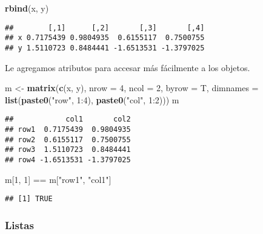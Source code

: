 \documentclass[]{article}
\newenvironment{Shaded}{\begin{snugshade}}{\end{snugshade}}
\newcommand{\KeywordTok}[1]{\textcolor[rgb]{0.13,0.29,0.53}{\textbf{{#1}}}}
\newcommand{\DataTypeTok}[1]{\textcolor[rgb]{0.13,0.29,0.53}{{#1}}}
\newcommand{\DecValTok}[1]{\textcolor[rgb]{0.00,0.00,0.81}{{#1}}}
\newcommand{\StringTok}[1]{\textcolor[rgb]{0.31,0.60,0.02}{{#1}}}
\newcommand{\NormalTok}[1]{{#1}}
\begin{document}
\begin{Shaded}
\begin{Highlighting}[]
\KeywordTok{rbind}\NormalTok{(x, y)}
\end{Highlighting}
\end{Shaded}

\begin{verbatim}
##        [,1]      [,2]       [,3]       [,4]
## x 0.7175439 0.9804935  0.6155117  0.7500755
## y 1.5110723 0.8484441 -1.6513531 -1.3797025
\end{verbatim}

Le agregamos atributos para accesar más fácilmente a los objetos.

\begin{Shaded}
\begin{Highlighting}[]
\NormalTok{m <-}\StringTok{ }\KeywordTok{matrix}\NormalTok{(}\KeywordTok{c}\NormalTok{(x, y), }\DataTypeTok{nrow =} \DecValTok{4}\NormalTok{, }\DataTypeTok{ncol =} \DecValTok{2}\NormalTok{, }\DataTypeTok{byrow =} \NormalTok{T,}
            \DataTypeTok{dimnames =} \KeywordTok{list}\NormalTok{(}\KeywordTok{paste0}\NormalTok{(}\StringTok{"row"}\NormalTok{, }\DecValTok{1}\NormalTok{:}\DecValTok{4}\NormalTok{),}
                            \KeywordTok{paste0}\NormalTok{(}\StringTok{"col"}\NormalTok{, }\DecValTok{1}\NormalTok{:}\DecValTok{2}\NormalTok{)))}
\NormalTok{m}
\end{Highlighting}
\end{Shaded}

\begin{verbatim}
##            col1       col2
## row1  0.7175439  0.9804935
## row2  0.6155117  0.7500755
## row3  1.5110723  0.8484441
## row4 -1.6513531 -1.3797025
\end{verbatim}

\begin{Shaded}
\begin{Highlighting}[]
\NormalTok{m[}\DecValTok{1}\NormalTok{, }\DecValTok{1}\NormalTok{] ==}\StringTok{ }\NormalTok{m[}\StringTok{"row1"}\NormalTok{, }\StringTok{"col1"}\NormalTok{]}
\end{Highlighting}
\end{Shaded}

\begin{verbatim}
## [1] TRUE
\end{verbatim}

\subsubsection{Listas}\label{listas}
\end{document}
